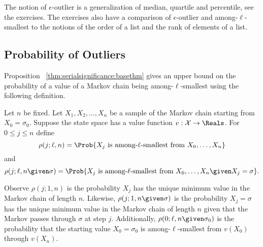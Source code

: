 \documentclass[12pt]{article}
\begin{document}
\begin{example}
    The notion of \( \epsilon \)-outlier is a generalization of median,
    quartile and percentile, see the exercises.  The exercises also have
    a comparison of \( \epsilon \)-outlier and among-\( \ell \)-smallest
    to the notions of the order of a list and the rank of elements of a
    list.
\end{example}

\subsection*{Probability of Outliers}

Proposition~%
\ref{thm:serialsignificance:basethm} gives an upper bound on the
probability of a value of a Markov chain being among-\( \ell \)-smallest
using the following definition.
\begin{definition}
    Let \( n \) be fixed.  Let \( X_1, X_2, \dots, X_n \) be a sample of
    the Markov chain starting from \( X_0 = \sigma_0 \). Suppose the
    state space has a value function \( v : \mathcal {X} \to \Reals \).
    For \( 0 \le j \le n \) define
    \[
        \rho(j; \ell, n) = \Prob{X_j \text{ is among-\( \ell \)-smallest
        from } X_0, \dots, X_n }
    \] and
    \[
        \rho(j; \ell, n \given \sigma) = \Prob{X_j \text{ is among-\(
        \ell \)-smallest from } X_0, \dots, X_n%
        \given X_j = \sigma }.
    \]
\end{definition}

Observe \( \rho(j; 1 ,n) \) is the probability \( X_j \) has the unique
minimum value in the Markov chain of length \( n \).  Likewise, \( \rho(j;
1, n \given \sigma) \) is the probability \( X_j = \sigma \) has the
unique minimum value in the Markov chain of length \( n \) given that
the Markov passes through \( \sigma \) at step \( j \).  Additionally, \(
\rho(0; \ell, n\given \sigma_0) \) is the probability that the starting
value \( X_0 = \sigma_0 \) is among-\( \ell \)-smallest from \( v(X_0) \)
through \( v(X_n) \).
\end{document}
